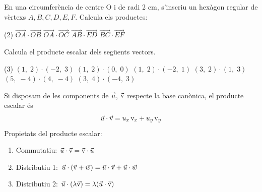 \begin{mylist}
	\exer En una circumferència de centre O i de radi 2 cm, s'inscriu un hexàgon regular de vèrtexs $A, B, C, D, E, F$. Calcula els productes:
		\begin{tasks}(2)
		\task $\overrightarrow{OA}\cdot \overrightarrow{OB}$
		\task $\overrightarrow{OA}\cdot \overrightarrow{OC}$ 
		\task  $\overrightarrow{AB}\cdot \overrightarrow{ED}$
		\task $\overrightarrow{BC}\cdot \overrightarrow{EF}$
	\end{tasks}

\begin{noexerbreak}
		
	\exer \mental Calcula el producte escalar dels següents vectors.
	\begin{tasks}(3)
		\task $\left(1,\; 2\right)\cdot \left(-2,\; 3\right)$  
		\task  $\left(1,\; 2\right)\cdot \left(0,\; 0\right)$  
		\task $\left(1,\; 2\right)\cdot \left(-2,\; 1\right)$  
		\task  $\left(3,\; 2\right)\cdot \left(1,\; 3\right)$
		\task  $\left(5,\; -4\right)\cdot \left(4,\; -4\right)$
		\task  $\left(3,\; 4\right) \cdot \left(-4,\; 3\right)$
	\end{tasks}
\answers{[4, 0, 0, 9, 36, 0]}
	
\end{noexerbreak}

\end{mylist}

\vspace{0.5cm}

\begin{theorybox}
	Si disposam de les components  de $\vec u$, $\vec{\mathrm{v}}$ respecte la base canònica, el producte escalar és
	\begin{equation}
	\label{eq:dotproduct2}
	\vec u \cdot \vec{\mathrm{v}}= u_x \, \mathrm{v}_x + u_y\, \mathrm{v}_y
	\end{equation}
	Propietats del producte escalar:
	\begin{enumerate}
		\item Commutatiu: $\vec u \cdot \vec{\mathrm{v}} = \vec{\mathrm{v}}\cdot \vec u$
		\item Distributiu 1: $\vec u \cdot (\vec{\mathrm{v}}+ \vec w) = \vec u \cdot \vec{\mathrm{v}}+ \vec u \cdot \vec w$	
		\item Distributiu 2: $\vec u \cdot (\lambda \vec{\mathrm{v}}) = \lambda (\vec u \cdot \vec{\mathrm{v}})$
	\end{enumerate}
\end{theorybox}

